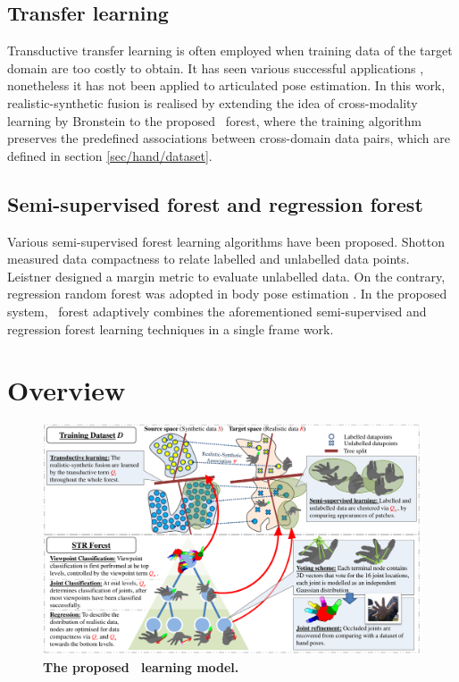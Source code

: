 \subsection{Transfer learning} 
Transductive transfer learning is often employed when training data of the target domain are too costly to obtain. 
It has seen various successful applications \cite{Pan2010}, nonetheless it has not been applied to articulated pose estimation. 
In this work, realistic-synthetic fusion is realised by extending the idea of cross-modality learning by Bronstein \etal \cite{Bronstein2010} to the proposed \STR\ forest, where the training algorithm preserves the predefined associations between cross-domain data pairs, which are defined in section \ref{sec/hand/dataset}.  

\subsection{Semi-supervised forest and regression forest} 
Various semi-supervised forest learning algorithms have been proposed. Shotton \etal \cite{Shotton2013} measured data compactness to relate labelled and unlabelled data points. Leistner \etal \cite{Leistner2009} designed a margin metric to evaluate unlabelled data. On the contrary, regression random forest was adopted in body pose estimation \cite{Girshick2011, Sun2012}. In the proposed system, \STR\ forest adaptively combines the aforementioned semi-supervised and regression forest learning techniques in a single frame work.

\section{Overview}

\begin{figure}[ht]
	\includegraphics[width=1.00\linewidth]{fig/hand/overview.pdf}
	\caption{\textbf{The proposed \STR\ learning model.}}
	\label{fig/hand/concept}
\end{figure}

